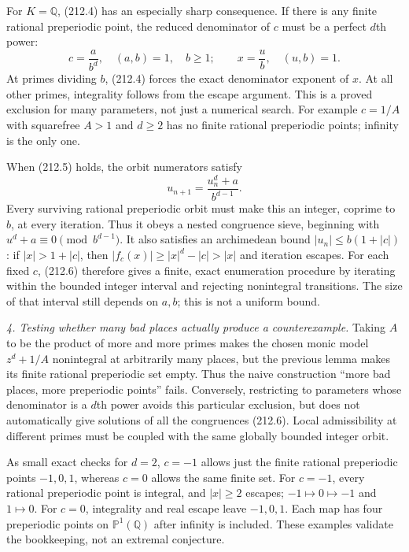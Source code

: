 \documentclass[11pt,a4paper]{article}
\newcommand{\Q}{\mathbb{Q}}
\newcommand{\PP}{\mathbb P}
\begin{document}
For $K=\Q$, (212.4) has an especially sharp consequence. If there is any
finite rational preperiodic point, the reduced denominator of $c$ must be
a perfect $d$th power:
\[
 c=\frac{a}{b^d},\quad (a,b)=1,\quad b\ge1;
 \qquad x=\frac{u}{b},\quad (u,b)=1.                           \tag{212.5}
\]
At primes dividing $b$, (212.4) forces the exact denominator exponent of
$x$. At all other primes, integrality follows from the escape argument.
This is a proved exclusion for many parameters, not just a numerical search.
For example $c=1/A$ with squarefree $A>1$ and $d\ge2$ has no finite rational
preperiodic points; infinity is the only one.

When (212.5) holds, the orbit numerators satisfy
\[
 u_{n+1}=\frac{u_n^d+a}{b^{d-1}}.                              \tag{212.6}
\]
Every surviving rational preperiodic orbit must make this an integer,
coprime to $b$, at every iteration. Thus it obeys a nested congruence sieve,
beginning with $u^d+a\equiv0\pmod{b^{d-1}}$. It also satisfies an archimedean
bound $|u_n|\le b(1+|c|)$: if $|x|>1+|c|$, then
$|f_c(x)|\ge |x|^d-|c|>|x|$ and iteration escapes. For each fixed $c$,
(212.6) therefore gives a finite, exact enumeration procedure by iterating
within the bounded integer interval and rejecting nonintegral transitions.
The size of that interval still depends on $a,b$; this is not a uniform
bound.

\textit{4. Testing whether many bad places actually produce a counterexample.}
Taking $A$ to be the product of more and more primes makes the chosen monic
model $z^d+1/A$ nonintegral at arbitrarily many places, but the previous
lemma makes its finite rational preperiodic set empty. Thus the naive
construction ``more bad places, more preperiodic points'' fails. Conversely,
restricting to parameters whose denominator is a $d$th power avoids this
particular exclusion, but does not automatically give solutions of all the
congruences (212.6). Local admissibility at different primes must be coupled
with the same globally bounded integer orbit.

As small exact checks for $d=2$, $c=-1$ allows just the finite rational
preperiodic points $-1,0,1$, whereas $c=0$ allows the same finite set. For
$c=-1$, every rational preperiodic point is integral, and $|x|\ge2$ escapes;
$-1\mapsto0\mapsto-1$ and $1\mapsto0$. For $c=0$, integrality and real
escape leave $-1,0,1$. Each map has four preperiodic points on $\PP^1(\Q)$
after infinity is included. These examples validate the bookkeeping, not an
extremal conjecture.
\end{document}
